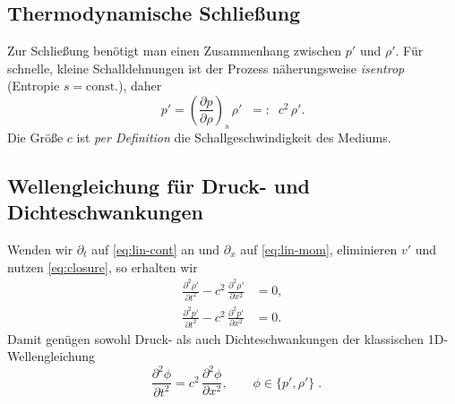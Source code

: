 \subsection{Thermodynamische Schließung}
Zur Schließung benötigt man einen Zusammenhang zwischen $p'$ und $\rho'$.
Für schnelle, kleine Schalldehnungen ist der Prozess näherungsweise
\emph{isentrop} (Entropie $s=\mathrm{const.}$), daher
\begin{equation}
    p'= \left(\frac{\partial p}{\partial \rho}\right)_{s}\,\rho' \;\;=: \;\; c^2\,\rho'.
    \label{eq:closure}
\end{equation}
Die Größe $c$ ist \emph{per Definition} die Schallgeschwindigkeit des Mediums.

\subsection{Wellengleichung für Druck- und Dichteschwankungen}
Wenden wir $\partial_t$ auf \eqref{eq:lin-cont} an und $\partial_x$ auf
\eqref{eq:lin-mom}, eliminieren $v'$ und nutzen \eqref{eq:closure},
so erhalten wir
\begin{align}
    \frac{\partial^2 \rho'}{\partial t^2} - c^2\,\frac{\partial^2 \rho'}{\partial x^2} &= 0, \\
    \frac{\partial^2 p'}{\partial t^2} - c^2\,\frac{\partial^2 p'}{\partial x^2} &= 0.
\end{align}
Damit genügen sowohl Druck- als auch Dichteschwankungen der klassischen
1D-Wellengleichung
\begin{equation}
    \;\;\frac{\partial^2 \phi}{\partial t^2} = c^2\,
    \frac{\partial^2 \phi}{\partial x^2}, \qquad \phi\in\{p',\rho'\}\; .
\end{equation}

\begin{comment}
\subsection{Alternative Form: Wellengleichung für die Teilchenverschiebung}
Führt man die \emph{Teilchenverschiebung} $\xi(x,t)$ ein mit $v'=\partial_t \xi$, so liefern \eqref{eq:lin-cont} und \eqref{eq:closure} nach Eliminierung von $p'$ und $\rho'$ ebenfalls
\begin{equation}
    \frac{\partial^2 \xi}{\partial t^2} = c^2\,\frac{\partial^2 \xi}{\partial x^2}.
\end{equation}
Diese Form ist besonders in der Elastodynamik von Festkörpern nützlich.
\end{comment}

